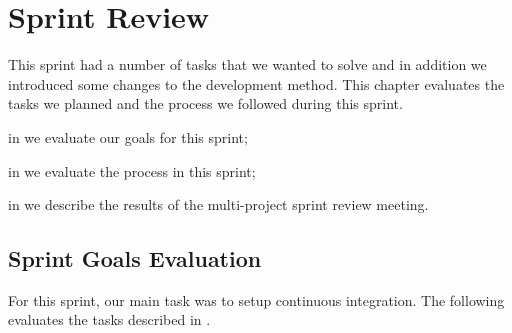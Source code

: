 \chapter{Sprint Review}\label{chap:sprint1_end}
This sprint had a number of tasks that we wanted to solve and in addition we introduced some changes to the development method. This chapter evaluates the tasks we planned and the process we followed during this sprint.

\begin{chapterorganization}
  \item in  we evaluate our goals for this sprint;
  \item in  we evaluate the process in this sprint;
  \item in  we describe the results of the multi-project sprint review meeting.
\end{chapterorganization}

\section{Sprint Goals Evaluation}\label{sec:s1_goals}
For this sprint, our main task was to setup continuous integration. The following evaluates the tasks described in .

